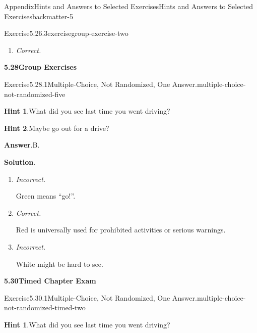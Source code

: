 \documentclass[oneside,10pt,]{book}
\newcommand{\blocktitlefont}{\relax}
\newcommand{\lititle}[1]{{\slshape#1}}
\numberwithin{equation}{section}
\begin{document}
\begin{solutions-chapter}{Appendix}{Hints and Answers to Selected Exercises}{}{Hints and Answers to Selected Exercises}{}{}{backmatter-5}
\begin{exercisegroup}
\begin{divisionsolutioneg}{Exercise}{5.26.3}{}{exercisegroup-exercise-two}
\begin{enumerate}[label={\Alph*.}]
%
\item{}\lititle{Correct.}\par%
%
\end{enumerate}
%
\end{divisionsolutioneg}%
\end{exercisegroup}
\par\medskip\noindent
\par\medskip
\noindent\textbf{\Large{}5.28\space\textperiodcentered\space{}Group Exercises}
\begin{divisionsolution}{Exercise}{5.28.1}{Multiple-Choice, Not Randomized, One Answer.}{multiple-choice-not-randomized-five}%
\par\smallskip%
\noindent\textbf{\blocktitlefont Hint 1}.\hypertarget{multiple-choice-not-randomized-five-4-back}{}\quad{}What did you see last time you went driving?%
\par\smallskip%
\noindent\textbf{\blocktitlefont Hint 2}.\hypertarget{multiple-choice-not-randomized-five-5-back}{}\quad{}Maybe go out for a drive?%
\par\smallskip%
\noindent\textbf{\blocktitlefont Answer}.\hypertarget{multiple-choice-not-randomized-five-6-back}{}\quad{}B.%
\par\smallskip%
\noindent\textbf{\blocktitlefont Solution}.\hypertarget{multiple-choice-not-randomized-five-7-back}{}\quad{}%
\begin{enumerate}[label={\Alph*.}]
\item{}\lititle{Incorrect.}\par%
Green means ``go!''.%
\item{}\lititle{Correct.}\par%
Red is universally used for prohibited activities or serious warnings.%
\item{}\lititle{Incorrect.}\par%
White might be hard to see.%
\end{enumerate}
%
\end{divisionsolution}%
\par\medskip
\noindent\textbf{\Large{}5.30\space\textperiodcentered\space{}Timed Chapter Exam}
\begin{divisionsolution}{Exercise}{5.30.1}{Multiple-Choice, Not Randomized, One Answer.}{multiple-choice-not-randomized-timed-two}%
\par\smallskip%
\noindent\textbf{\blocktitlefont Hint 1}.\hypertarget{multiple-choice-not-randomized-timed-two-4-back}{}\quad{}What did you see last time you went driving?%
\par\smallskip%

\end{divisionsolution}
\end{solutions-chapter}
\end{document}
